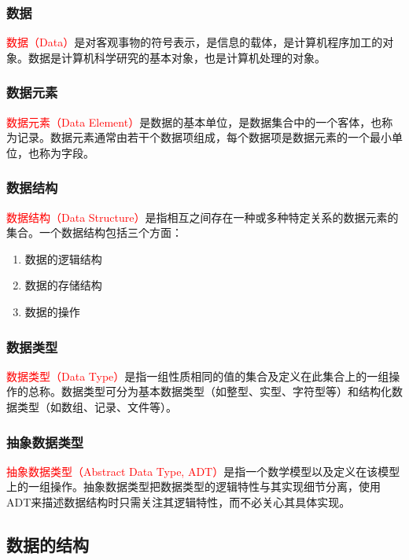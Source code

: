 \documentclass{../../note}
\begin{document}
\subsubsection{数据}
\textcolor{red}{数据（Data）}是对客观事物的符号表示，是信息的载体，是计算机程序加工的对象。数据是计算机科学研究的基本对象，也是计算机处理的对象。

\subsubsection{数据元素}
\textcolor{red}{数据元素（Data Element）}是数据的基本单位，是数据集合中的一个客体，也称为记录。数据元素通常由若干个数据项组成，每个数据项是数据元素的一个最小单位，也称为字段。

\subsubsection{数据结构}
\textcolor{red}{数据结构（Data Structure）}是指相互之间存在一种或多种特定关系的数据元素的集合。一个数据结构包括三个方面：
\begin{enumerate}
  \item 数据的逻辑结构
  \item 数据的存储结构
  \item 数据的操作
\end{enumerate}

\subsubsection{数据类型}
\textcolor{red}{数据类型（Data Type）}是指一组性质相同的值的集合及定义在此集合上的一组操作的总称。数据类型可分为基本数据类型（如整型、实型、字符型等）和结构化数据类型（如数组、记录、文件等）。

\subsubsection{抽象数据类型}
\textcolor{red}{抽象数据类型（Abstract Data Type, ADT）}是指一个数学模型以及定义在该模型上的一组操作。抽象数据类型把数据类型的逻辑特性与其实现细节分离，使用ADT来描述数据结构时只需关注其逻辑特性，而不必关心其具体实现。

\subsection{数据的结构}
\end{document}
